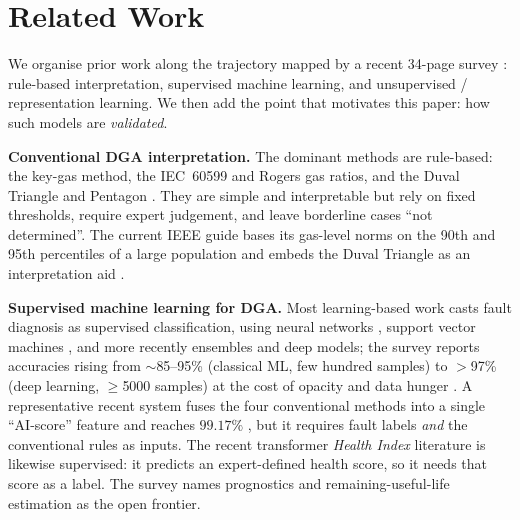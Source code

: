 \section{Related Work}
\label{sec:related}

We organise prior work along the trajectory mapped by a recent 34-page survey
\cite{ramarao2026review}: rule-based interpretation, supervised machine learning, and
unsupervised / representation learning. We then add the point that motivates this paper:
how such models are \emph{validated}.

\textbf{Conventional DGA interpretation.}
The dominant methods are rule-based: the key-gas method, the IEC~60599 and Rogers gas
ratios, and the Duval Triangle and Pentagon
\cite{iec60599,ieee_c57104,duval2002review,duval2008ltc,duval2001interp}. They are simple and
interpretable but rely on fixed thresholds, require expert judgement, and leave borderline
cases ``not determined''. The current IEEE guide bases its gas-level norms on the 90th and
95th percentiles of a large population and embeds the Duval Triangle as an interpretation
aid \cite{ieee_c57104}.

\textbf{Supervised machine learning for DGA.}
Most learning-based work casts fault diagnosis as supervised classification, using neural
networks \cite{zhang1996ann}, support vector machines \cite{bacha2012svm,fei2009svmga}, and
more recently ensembles and deep models; the survey reports accuracies rising from
$\sim$85--95\% (classical ML, few hundred samples) to $>$97\% (deep learning, $\geq$5000
samples) at the cost of opacity and data hunger \cite{ramarao2026review}. A representative
recent system fuses the four conventional methods into a single ``AI-score'' feature and
reaches $99.17\%$ \cite{hybrid_aiscore2026}, but it requires fault labels \emph{and} the
conventional rules as inputs. The recent transformer \emph{Health Index} literature is
likewise supervised: it predicts an expert-defined health score, so it needs that score as a
label. The survey names prognostics and remaining-useful-life estimation as the open frontier.

